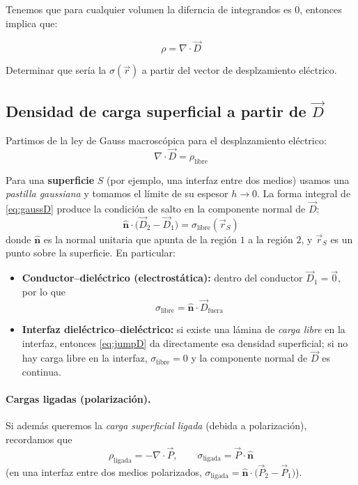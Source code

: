 \documentclass{article}
\begin{document}
Tenemos que para cualquier volumen la diferncia de integrandos es $0$, entonces implica que:

\[ \rho = \nabla \cdot \vec{D} \]

Determinar que sería la $\sigma(\vec{r})$ a partir del vector de desplzamiento eléctrico. 
 
 
\subsection{Densidad de carga superficial a partir de \texorpdfstring{$\vec D$}{D}}

Partimos de la ley de Gauss macroscópica para el desplazamiento eléctrico:
\begin{equation}
\boxed{\ \nabla\!\cdot\!\vec D=\rho_{\text{libre}}\ }
\label{eq:gaussD}
\end{equation}

Para una \textbf{superficie} $S$ (por ejemplo, una interfaz entre dos medios) usamos una \emph{pastilla gaussiana} y tomamos el límite de su espesor $h\to 0$. La forma integral de \eqref{eq:gaussD} produce la condición de salto en la componente normal de $\vec D$:
\begin{equation}
\boxed{\ \hat{\boldsymbol n}\!\cdot\!\big(\vec D_{2}-\vec D_{1}\big)=\sigma_{\text{libre}}(\vec r_{S})\ }
\label{eq:jumpD}
\end{equation}
donde $\hat{\boldsymbol n}$ es la normal unitaria que apunta de la región $1$ a la región $2$, y $\vec r_{S}$ es un punto sobre la superficie. En particular:

\begin{itemize}
\item \textbf{Conductor–dieléctrico (electrostática):} dentro del conductor $\vec D_{1}=\vec 0$, por lo que
\begin{equation}
\boxed{\ \sigma_{\text{libre}}=\hat{\boldsymbol n}\!\cdot\!\vec D_{\text{fuera}}\ }
\label{eq:sigma_conductor}
\end{equation}

\item \textbf{Interfaz dieléctrico–dieléctrico:} si existe una lámina de \emph{carga libre} en la interfaz, entonces \eqref{eq:jumpD} da directamente esa densidad superficial; si no hay carga libre en la interfaz, \(\sigma_{\text{libre}}=0\) y la componente normal de \(\vec D\) es continua.
\end{itemize}

\paragraph{Cargas ligadas (polarización).}
Si además queremos la \emph{carga superficial ligada} (debida a polarización), recordamos que
\begin{equation}
\boxed{\ \rho_{\text{ligada}}=-\nabla\!\cdot\!\vec P,\qquad
\sigma_{\text{ligada}}=\vec P\!\cdot\!\hat{\boldsymbol n}\ }
\label{eq:bound}
\end{equation}
(en una interfaz entre dos medios polarizados, \(\sigma_{\text{ligada}}=\hat{\boldsymbol n}\!\cdot\!\big(\vec P_{2}-\vec P_{1}\big)\)).
\end{document}
